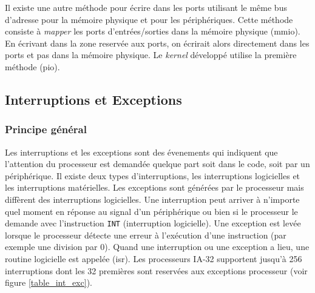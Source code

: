 Il existe une autre méthode pour écrire dans les ports utilisant le même bus d'adresse
pour la mémoire physique et pour les périphériques. Cette méthode consiste à
\textit{mapper} les ports d'entrées/sorties dans la mémoire physique (\acrshort{mmio}).
En écrivant dans la zone reservée aux ports, on écrirait alors directement dans
les ports et pas dans la mémoire physique. Le \textit{kernel} développé utilise
la première méthode (\acrshort{pio}).


\subsection{Interruptions et Exceptions}
\subsubsection{Principe général}
Les interruptions et les exceptions sont des évenements qui indiquent que l'attention
du processeur est demandée quelque part soit dans le code, soit par un périphérique.
Il existe deux types d'interruptions, les interruptions logicielles et les interruptions
matérielles. Les exceptions sont générées par le processeur mais diffèrent des
interruptions logicielles. Une interruption peut arriver à n'importe quel moment
en réponse au signal d'un périphérique ou bien si le processeur le demande
avec l'instruction \texttt{INT} (interruption logicielle). Une exception
est levée lorsque le processeur détecte une erreur à l'exécution d'une instruction
(par exemple une division par 0). Quand une interruption ou une exception
a lieu, une routine logicielle est appelée (\acrshort{isr}). Les processeurs \acrshort{IA-32}
supportent jusqu'à 256 interruptions dont les 32 premières sont reservées aux exceptions
processeur (voir figure \ref{table_int_exc}).\cite{ref42,ref66} \\


